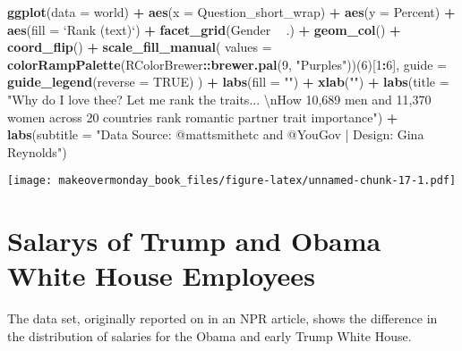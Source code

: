 \documentclass[]{book}
\newenvironment{Shaded}{\begin{snugshade}}{\end{snugshade}}
\newcommand{\KeywordTok}[1]{\textcolor[rgb]{0.13,0.29,0.53}{\textbf{#1}}}
\newcommand{\DataTypeTok}[1]{\textcolor[rgb]{0.13,0.29,0.53}{#1}}
\newcommand{\DecValTok}[1]{\textcolor[rgb]{0.00,0.00,0.81}{#1}}
\newcommand{\CharTok}[1]{\textcolor[rgb]{0.31,0.60,0.02}{#1}}
\newcommand{\StringTok}[1]{\textcolor[rgb]{0.31,0.60,0.02}{#1}}
\newcommand{\OtherTok}[1]{\textcolor[rgb]{0.56,0.35,0.01}{#1}}
\newcommand{\OperatorTok}[1]{\textcolor[rgb]{0.81,0.36,0.00}{\textbf{#1}}}
\newcommand{\NormalTok}[1]{#1}
\theoremstyle{definition}
\theoremstyle{definition}
\theoremstyle{definition}
\theoremstyle{remark}
\begin{document}
\begin{Shaded}
\begin{Highlighting}[]
\KeywordTok{ggplot}\NormalTok{(}\DataTypeTok{data =}\NormalTok{ world) }\OperatorTok{+}\StringTok{ }
\StringTok{  }\KeywordTok{aes}\NormalTok{(}\DataTypeTok{x =}\NormalTok{ Question_short_wrap) }\OperatorTok{+}
\StringTok{  }\KeywordTok{aes}\NormalTok{(}\DataTypeTok{y =}\NormalTok{ Percent) }\OperatorTok{+}
\StringTok{  }\KeywordTok{aes}\NormalTok{(}\DataTypeTok{fill =} \StringTok{`}\DataTypeTok{Rank (text)}\StringTok{`}\NormalTok{) }\OperatorTok{+}
\StringTok{  }\KeywordTok{facet_grid}\NormalTok{(Gender }\OperatorTok{~}\StringTok{ }\NormalTok{.) }\OperatorTok{+}
\StringTok{  }\KeywordTok{geom_col}\NormalTok{() }\OperatorTok{+}
\StringTok{  }\KeywordTok{coord_flip}\NormalTok{() }\OperatorTok{+}
\StringTok{  }\KeywordTok{scale_fill_manual}\NormalTok{(}
    \DataTypeTok{values =} \KeywordTok{colorRampPalette}\NormalTok{(RColorBrewer}\OperatorTok{::}\KeywordTok{brewer.pal}\NormalTok{(}\DecValTok{9}\NormalTok{, }\StringTok{"Purples"}\NormalTok{))(}\DecValTok{6}\NormalTok{)[}\DecValTok{1}\OperatorTok{:}\DecValTok{6}\NormalTok{],}
    \DataTypeTok{guide =} \KeywordTok{guide_legend}\NormalTok{(}\DataTypeTok{reverse =} \OtherTok{TRUE}\NormalTok{)}
\NormalTok{  ) }\OperatorTok{+}
\StringTok{  }\KeywordTok{labs}\NormalTok{(}\DataTypeTok{fill =} \StringTok{""}\NormalTok{) }\OperatorTok{+}
\StringTok{  }\KeywordTok{xlab}\NormalTok{(}\StringTok{""}\NormalTok{) }\OperatorTok{+}
\StringTok{  }\KeywordTok{labs}\NormalTok{(}\DataTypeTok{title =} \StringTok{"Why do I love thee?  Let me rank the traits... }\CharTok{\textbackslash{}n}\StringTok{How 10,689 men and 11,370 women across 20 countries rank romantic partner trait importance"}\NormalTok{) }\OperatorTok{+}
\StringTok{  }\KeywordTok{labs}\NormalTok{(}\DataTypeTok{subtitle =} \StringTok{"Data Source: @mattsmithetc and @YouGov | Design: Gina Reynolds"}\NormalTok{) }
\end{Highlighting}
\end{Shaded}

\texttt{[image: makeovermonday\_book\_files/figure-latex/unnamed-chunk-17-1.pdf]}

\chapter{Salarys of Trump and Obama White House
Employees}\label{salarys-of-trump-and-obama-white-house-employees}

The data set, originally reported on in an NPR article, shows the
difference in the distribution of salaries for the Obama and early Trump
White House.
\end{document}
